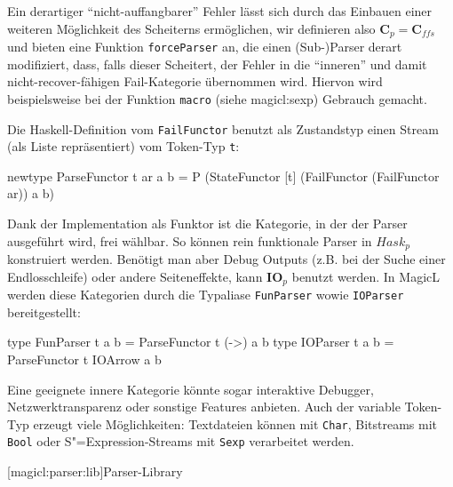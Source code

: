 \documentclass[a4paper, bibgerm]{book}
\newcommand\icode[1]{\lstinline?#1?}
\newcommand\lsubsection{}
\newcommand\sref{}
\newcommand{\sees}[1]{(siehe \sref{#1})}
\newcommand{\sexp}{S"=Expression}
\begin{document}
Ein derartiger "`nicht-auffangbarer"' Fehler lässt sich durch das
Einbauen einer weiteren Möglichkeit des Scheiterns ermöglichen, wir
definieren also $\mathbf{C}_p = \mathbf{C}_{ffs}$ und bieten eine
Funktion \icode{forceParser} an, die einen (Sub-)Parser derart
modifiziert, dass, falls dieser Scheitert, der Fehler in die "`inneren"'
und damit nicht-recover-fähigen Fail-Kategorie übernommen wird. Hiervon
wird beispielsweise bei der Funktion \icode{macro}
\sees{magicl:sexp} Gebrauch gemacht.

Die Haskell-Definition vom \icode{FailFunctor} benutzt als Zustandstyp
einen Stream (als Liste repräsentiert) vom Token-Typ \icode{t}:

\begin{code}
newtype ParseFunctor t ar a b = 
  P (StateFunctor 
     [t] 
     (FailFunctor (FailFunctor ar))
     a
     b)
\end{code}

Dank der Implementation als Funktor ist die Kategorie, in der der Parser
ausgeführt wird, frei wählbar. So können rein funktionale Parser in
$Hask_p$ konstruiert werden. Benötigt man aber Debug Outputs (z.B. bei
der Suche einer Endlosschleife) oder andere Seiteneffekte, kann
$\mathbf{IO}_p$ benutzt werden. In MagicL werden diese Kategorien durch
die Typaliase \icode{FunParser} wowie \icode{IOParser} bereitgestellt:
\begin{code}
type FunParser t a b = ParseFunctor t (->) a b
type IOParser  t a b = ParseFunctor t IOArrow a b
\end{code}
Eine geeignete innere Kategorie könnte
sogar interaktive Debugger, Netzwerktransparenz oder sonstige Features
anbieten. Auch der variable Token-Typ erzeugt viele Möglichkeiten:
Textdateien können mit \icode{Char}, Bitstreams mit \icode{Bool} oder
\sexp{}-Streams mit \icode{Sexp} verarbeitet werden.

\lsubsection[magicl:parser:lib]{Parser-Library}
\end{document}
